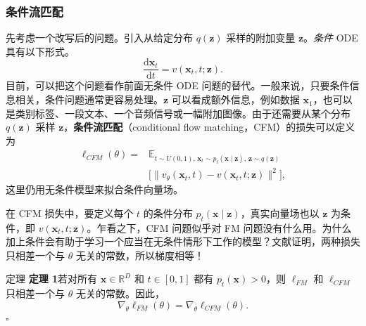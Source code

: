 \subsubsection{条件流匹配}

先考虑一个改写后的问题。引入从给定分布 $q(\mathbf z)$ 采样的附加变量 $\mathbf z$。\emph{条件} ODE 具有以下形式。
\begin{equation}
  \frac{\mathrm d\mathbf x_t}{\mathrm dt}=v(\mathbf x_t,t;\mathbf z).
  \tag{9.61}\label{eq:09-61}
\end{equation}
目前，可以把这个问题看作前面无条件 ODE 问题的替代。一般来说，只要条件信息相关，条件问题通常更容易处理。$\mathbf z$ 可以看成额外信息，例如数据 $\mathbf x_1$，也可以是类别标签、一段文本、一个音频信号或一幅附加图像。由于还需要从某个分布 $q(\mathbf z)$ 采样 $\mathbf z$，\textbf{条件流匹配}（conditional flow matching，CFM）的损失可以定义为
\begin{equation}
  \begin{aligned}
    \ell_{\mathit{CFM}}(\theta)
      ={}&\mathbb E_{t\sim U(0,1),\,\mathbf x_t\sim p_t(\mathbf x\mid\mathbf z),\,\mathbf z\sim q(\mathbf z)}
      \\[-1pt]
      &\bigl[\lVert v_\theta(\mathbf x_t,t)-v(\mathbf x_t,t;\mathbf z)\rVert^2\bigr],
  \end{aligned}
  \tag{9.62}\label{eq:09-62}
\end{equation}
这里仍用无条件模型来拟合条件向量场。

在 CFM 损失中，要定义每个 $t$ 的条件分布 $p_t(\mathbf x\mid\mathbf z)$，真实向量场也以 $\mathbf z$ 为条件，即 $v(\mathbf x_t,t;\mathbf z)$。乍看之下，CFM 问题似乎对 FM 问题没有什么用。为什么加上条件会有助于学习一个应当在无条件情形下工作的模型？文献证明，两种损失只相差一个与 $\theta$ 无关的常数，所以梯度相等！

\begin{booknote}{定理 }
\textbf{定理 1}\quad 若对所有 $\mathbf x\in\mathbb R^D$ 和 $t\in[0,1]$ 都有 $p_t(\mathbf x)>0$，则 $\ell_{\mathit{FM}}$ 和 $\ell_{\mathit{CFM}}$ 只相差一个与 $\theta$ 无关的常数。因此，
\[
  \nabla_\theta\ell_{\mathit{FM}}(\theta)=\nabla_\theta\ell_{\mathit{CFM}}(\theta).
\]
\hfill\(\square\)
\end{booknote}


